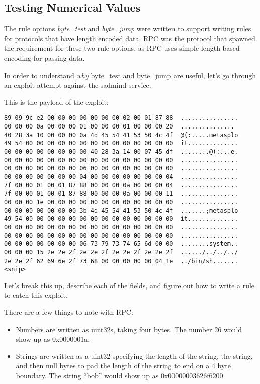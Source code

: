 \documentclass[english]{report}
\begin{document}
\subsection{Testing Numerical Values}
\label{testing numerical values}

The rule options \emph{byte\_test} and \emph{byte\_jump} were written to
support writing rules for protocols that have length encoded data.  RPC was the
protocol that spawned the requirement for these two rule options, as RPC uses
simple length based encoding for passing data.

In order to understand \emph{why} byte\_test and byte\_jump are useful, let's
go through an exploit attempt against the sadmind service.

This is the payload of the exploit:

\begin{verbatim}
89 09 9c e2 00 00 00 00 00 00 00 02 00 01 87 88  ................
00 00 00 0a 00 00 00 01 00 00 00 01 00 00 00 20  ...............
40 28 3a 10 00 00 00 0a 4d 45 54 41 53 50 4c 4f  @(:.....metasplo
49 54 00 00 00 00 00 00 00 00 00 00 00 00 00 00  it..............
00 00 00 00 00 00 00 00 40 28 3a 14 00 07 45 df  ........@(:...e.
00 00 00 00 00 00 00 00 00 00 00 00 00 00 00 00  ................
00 00 00 00 00 00 00 06 00 00 00 00 00 00 00 00  ................
00 00 00 00 00 00 00 04 00 00 00 00 00 00 00 04  ................
7f 00 00 01 00 01 87 88 00 00 00 0a 00 00 00 04  ................
7f 00 00 01 00 01 87 88 00 00 00 0a 00 00 00 11  ................
00 00 00 1e 00 00 00 00 00 00 00 00 00 00 00 00  ................
00 00 00 00 00 00 00 3b 4d 45 54 41 53 50 4c 4f  .......;metasplo
49 54 00 00 00 00 00 00 00 00 00 00 00 00 00 00  it..............
00 00 00 00 00 00 00 00 00 00 00 00 00 00 00 00  ................
00 00 00 00 00 00 00 00 00 00 00 00 00 00 00 00  ................
00 00 00 00 00 00 00 06 73 79 73 74 65 6d 00 00  ........system..
00 00 00 15 2e 2e 2f 2e 2e 2f 2e 2e 2f 2e 2e 2f  ....../../../../
2e 2e 2f 62 69 6e 2f 73 68 00 00 00 00 00 04 1e  ../bin/sh.......
<snip>
\end{verbatim}

Let's break this up, describe each of the fields, and figure out how to write a
rule to catch this exploit.  

There are a few things to note with RPC:

\begin{itemize}

\item Numbers are written as uint32s, taking four bytes.  The number 26 would
show up as 0x0000001a.

\item Strings are written as a uint32 specifying the length of the string, the
string, and then null bytes to pad the length of the string to end on a 4 byte
boundary.  The string ``bob'' would show up as 0x00000003626f6200.

\end{itemize}
\end{document}
